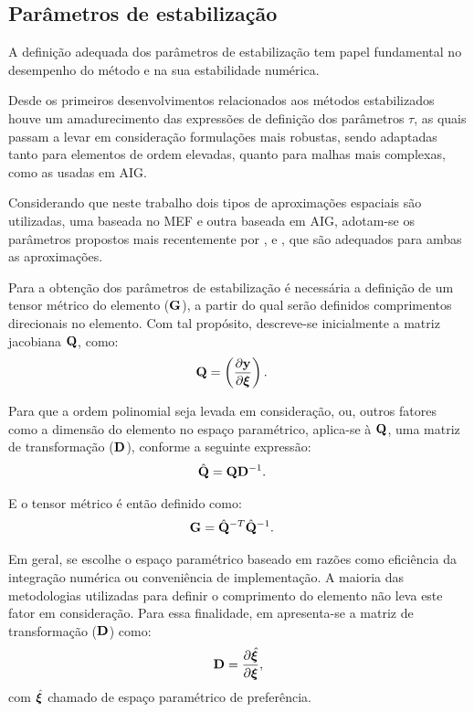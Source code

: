 \subsection{Parâmetros de estabilização}\label{capitulo:Cap2:FormaFraca:taus}

A definição adequada dos parâmetros de estabilização tem papel fundamental no desempenho do método e na sua estabilidade numérica.

Desde os primeiros desenvolvimentos relacionados aos métodos estabilizados houve um amadurecimento das expressões de definição dos parâmetros $\tau$, as quais passam a levar em consideração formulações mais robustas, sendo adaptadas tanto para elementos de ordem elevadas, quanto para malhas mais complexas, como as usadas em AIG.

Considerando que neste trabalho dois tipos de aproximações espaciais são utilizadas, uma baseada no MEF e outra baseada em AIG, adotam-se os parâmetros propostos mais recentemente por ,  e , que são adequados para ambas as aproximações. 

Para a obtenção dos parâmetros de estabilização é necessária a definição de um tensor métrico do elemento ($\mathbf{G}$), a partir do qual serão definidos comprimentos direcionais no elemento. Com tal propósito, descreve-se inicialmente a matriz jacobiana $\mathbf{Q}$, como:
\begin{align}
	\mathbf{Q}&=\left(\frac{\partial\mathbf{y}}{\partial\bm{\xi}}\right).
\end{align}

Para que a ordem polinomial seja levada em consideração, ou, outros fatores como a dimensão do elemento no espaço paramétrico, aplica-se à $\mathbf{Q}$, uma matriz de transformação ($\mathbf{D}$), conforme a seguinte expressão:
\begin{align}
	\hat{\mathbf{Q}}&=\mathbf{Q}\mathbf{D}^{-1} \label{eq:q_chap}.
\end{align}

E o tensor métrico é então definido como:
\begin{align}
	\mathbf{G} &= \hat{\mathbf{Q}}^{-T} \hat{\mathbf{Q}}^{-1}. \label{eq:tensor_metrico}
\end{align}

Em geral, se escolhe o espaço paramétrico baseado em razões como eficiência da integração numérica ou conveniência de implementação. A maioria das metodologias utilizadas para definir o comprimento do elemento não leva este fator em consideração. Para essa finalidade, em  apresenta-se a matriz de transformação ($\mathbf{D}$) como:
\begin{align}
	\mathbf{D} = \frac{\partial{\hat{\bm{\xi}}}}{\partial{\bm{\xi}}},
\end{align}
\noindent com $\hat{\bm{\xi}}$ chamado de espaço paramétrico de preferência.

